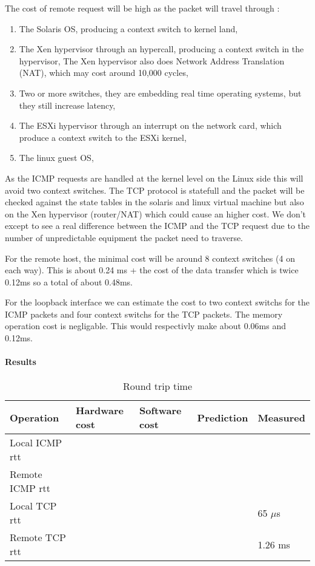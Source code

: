 The cost of remote request will be high as the packet will travel through :
\begin{enumerate}
\item The Solaris OS, producing a context switch to kernel land,
\item The Xen hypervisor through an hypercall, producing a context switch in the
hypervisor,
The Xen hypervisor also does Network Address Translation (NAT), which may cost
around 10,000 cycles,
\item Two or more switches, they are embedding real time operating systems,
but they still increase latency,
\item The ESXi hypervisor through an interrupt on the network card, which
produce a context switch to the ESXi kernel,
\item The linux guest OS,
\end{enumerate}

As the ICMP requests are handled at the kernel level on the Linux side this will
avoid two context switches.
The TCP protocol is statefull and the packet will be checked against the state
tables in the solaris and linux virtual machine but also on the Xen hypervisor
(router/NAT) which could cause an higher cost.
We don't except to see a real difference between the ICMP and the TCP request
due to the number of unpredictable equipment the packet need to traverse.

For the remote host, the minimal cost will be around 8 context switches (4 on
each way).
This is about 0.24 ms + the cost of the data transfer which is twice 0.12ms so a total of
about 0.48ms.

For the loopback interface we can estimate the cost to two context switchs for
the ICMP packets and four context switchs for the TCP packets.
The memory operation cost is negligable.
This would respectivly make about 0.06ms and 0.12ms.




\paragraph{Results}

\begin{table}[h]
\begin{center}
\begin{tabular}{| l | l | l | l | l |}
\hline
Operation 		& Hardware cost 	& Software cost 	& Prediction 		& Measured \\ \hline
Local ICMP rtt		&			&			&			& 		\\ \hline
Remote ICMP rtt		&			&			&			& 		\\ \hline
Local TCP rtt		&		& 	&		& 65 $\mu$s\\ \hline
Remote TCP rtt		&			&			& & 1.26 ms	\\ \hline


\end{tabular}
\end{center}
\caption{Round trip time\label{tab:rtt}}
\end{table}


